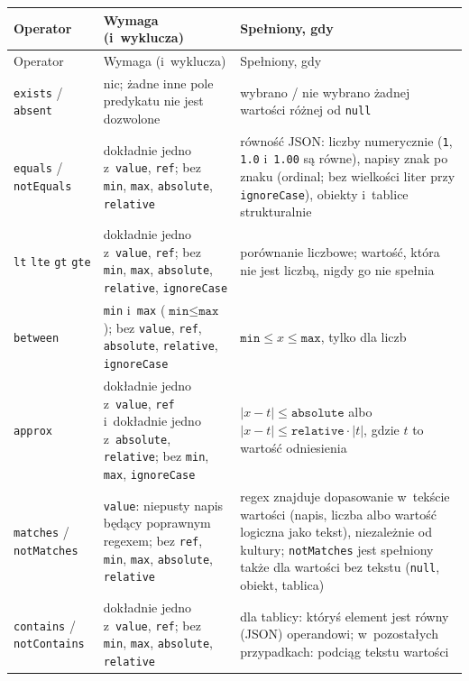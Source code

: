 {\small
\begin{xltabular}{\linewidth}{@{}>{\raggedright\arraybackslash}p{2.9cm} >{\raggedright\arraybackslash}p{5.3cm} >{\raggedright\arraybackslash}X@{}}
\toprule
Operator & Wymaga (i~wyklucza) & Spełniony, gdy \\
\midrule
\endfirsthead
\toprule
Operator & Wymaga (i~wyklucza) & Spełniony, gdy \\
\midrule
\endhead
\bottomrule
\endlastfoot
\texttt{exists} / \texttt{absent} & nic; żadne inne pole predykatu nie jest dozwolone &
wybrano / nie wybrano żadnej wartości różnej od \texttt{null} \\
\texttt{equals} / \texttt{notEquals} & dokładnie jedno z~\texttt{value}, \texttt{ref}; bez
\texttt{min}, \texttt{max}, \texttt{absolute}, \texttt{relative} & równość JSON: liczby
numerycznie (\texttt{1}, \texttt{1.0} i~\texttt{1.00} są równe), napisy znak po znaku (ordinal; bez
wielkości liter przy \texttt{ignoreCase}), obiekty i~tablice strukturalnie \\
\texttt{lt} \texttt{lte} \texttt{gt} \texttt{gte} & dokładnie jedno z~\texttt{value},
\texttt{ref}; bez \texttt{min}, \texttt{max}, \texttt{absolute}, \texttt{relative},
\texttt{ignoreCase} & porównanie liczbowe; wartość, która nie jest liczbą, nigdy go nie
spełnia \\
\texttt{between} & \texttt{min} i~\texttt{max} ($\texttt{min} \leq \texttt{max}$); bez
\texttt{value}, \texttt{ref}, \texttt{absolute}, \texttt{relative}, \texttt{ignoreCase} &
$\texttt{min} \leq x \leq \texttt{max}$, tylko dla liczb \\
\texttt{approx} & dokładnie jedno z~\texttt{value}, \texttt{ref} i~dokładnie jedno z~\texttt{absolute}, \texttt{relative}; bez \texttt{min}, \texttt{max}, \texttt{ignoreCase} &
$|x - t| \leq \texttt{absolute}$ albo $|x - t| \leq \texttt{relative} \cdot |t|$, gdzie $t$ to
wartość odniesienia \\
\texttt{matches} / \texttt{notMatches} & \texttt{value}: niepusty napis będący poprawnym
regexem; bez \texttt{ref}, \texttt{min}, \texttt{max}, \texttt{absolute}, \texttt{relative} &
regex znajduje dopasowanie w~tekście wartości (napis, liczba albo wartość logiczna jako
tekst), niezależnie od kultury; \texttt{notMatches} jest spełniony także dla wartości bez
tekstu (\texttt{null}, obiekt, tablica) \\
\texttt{contains} / \texttt{notContains} & dokładnie jedno z~\texttt{value}, \texttt{ref};
bez \texttt{min}, \texttt{max}, \texttt{absolute}, \texttt{relative} & dla tablicy: któryś
element jest równy (JSON) operandowi; w~pozostałych przypadkach: podciąg tekstu wartości \\

\end{xltabular}}
